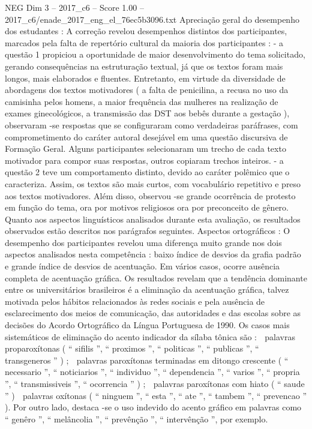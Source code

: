 \begin{textsample}{NEG Dim 3 – 2017\_c6 – Score 1.00 – 2017\_c6/enade\_2017\_eng\_el\_76ec5b3096.txt}
Apreciação geral do desempenho dos estudantes : A correção revelou desempenhos distintos dos participantes, marcados pela falta de repertório cultural da maioria dos participantes : - a questão 1 propiciou a oportunidade de maior desenvolvimento do tema solicitado, gerando consequências na estruturação textual, já que os textos foram mais longos, mais elaborados e fluentes.
Entretanto, em virtude da diversidade de abordagens dos textos motivadores ( a falta de penicilina, a recusa no uso da camisinha pelos homens, a maior frequência das mulheres na realização de exames ginecológicos, a transmissão das DST aos bebês durante a gestação ), observaram -se respostas que se configuraram como verdadeiras paráfrases, com comprometimento do caráter autoral desejável em uma questão discursiva de Formação Geral.
Alguns participantes selecionaram um trecho de cada texto motivador para compor suas respostas, outros copiaram trechos inteiros. - a questão 2 teve um comportamento distinto, devido ao caráter polêmico que o caracteriza.
Assim, os textos são mais curtos, com vocabulário repetitivo e preso aos textos motivadores.
Além disso, observou -se grande ocorrência de protesto em função do tema, ora por motivos religiosos ora por preconceito de gênero.
Quanto aos aspectos linguísticos analisados durante esta avaliação, os resultados observados estão descritos nos parágrafos seguintes.
Aspectos ortográficos : O desempenho dos participantes revelou uma diferença muito grande nos dois aspectos analisados nesta competência : baixo índice de desvios da grafia padrão e grande índice de desvios de acentuação.
Em vários casos, ocorre ausência completa de acentuação gráfica.
Os resultados revelam que a tendência dominante entre os universitários brasileiros é a eliminação da acentuação gráfica, talvez motivada pelos hábitos relacionados às redes sociais e pela ausência de esclarecimento dos meios de comunicação, das autoridades e das escolas sobre as decisões do Acordo Ortográfico da Língua Portuguesa de 1990.
Os casos mais sistemáticos de eliminação do acento indicador da sílaba tônica são :  palavras proparoxítonas ( “ sifilis ”, “ proximos ”, “ politicas ”, “ publicas ”, “ transgeneros ” ) ;  palavras paroxítonas terminadas em ditongo crescente ( “ necessario ”, “ noticiarios ”, “ individuo ”, “ dependencia ”, “ varios ”, “ propria ”, “ transmissiveis ”, “ ocorrencia ” ) ;  palavras paroxítonas com hiato ( “ saude ” )  palavras oxítonas ( “ ninguem ”, “ esta ”, “ ate ”, “ tambem ”, “ prevencao ” ).
Por outro lado, destaca -se o uso indevido do acento gráfico em palavras como “ genêro ”, “ melâncolia ”, “ prevênção ”, “ intervênção ”, por exemplo.

\end{textsample}
